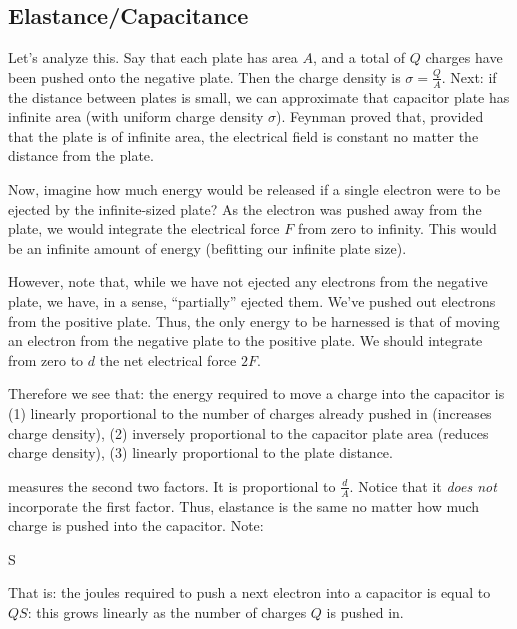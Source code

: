 \documentclass[11pt, oneside]{amsart}
\begin{document}
\subsection{Elastance/Capacitance}

Let's analyze this. Say that each plate has area $A$, and a total of $Q$
charges have been pushed onto the negative plate. Then the charge
density is $\sigma = \frac{Q}{A}$. Next: if the distance between plates
is small, we can approximate that capacitor plate has infinite area
(with uniform charge density $\sigma$). Feynman proved that, provided
that the plate is of infinite area, the electrical field is constant no
matter the distance from the plate.


Now, imagine how much energy would be released if a single electron were
to be ejected by the infinite-sized plate? As the electron was pushed
away from the plate, we would integrate the electrical force $F$ from
zero to infinity. This would be an infinite amount of energy (befitting
our infinite plate size).

However, note that, while we have not ejected any electrons from the
negative plate, we have, in a sense, ``partially'' ejected them. We've
pushed out electrons from the positive plate. Thus, the only energy to
be harnessed is that of moving an electron from the negative plate to
the positive plate. We should integrate from zero to $d$ the net
electrical force $2F$.

Therefore we see that: the energy required to move a charge into the
capacitor is (1) linearly proportional to the number of charges already
pushed in (increases charge density), (2) inversely proportional to the
capacitor plate area (reduces charge density), (3) linearly proportional
to the plate distance.

 measures the second two factors. It is proportional
to $\frac{d}{A}$. Notice that it \emph{does not} incorporate the first
factor. Thus, elastance is the same no matter how much charge is pushed
into the capacitor. Note:

\begin{nedqn}
\eqcol
  S
\end{nedqn}

That is: the joules required to push a next electron into a capacitor is
equal to $QS$: this grows linearly as the number of charges $Q$ is
pushed in.
\end{document}
